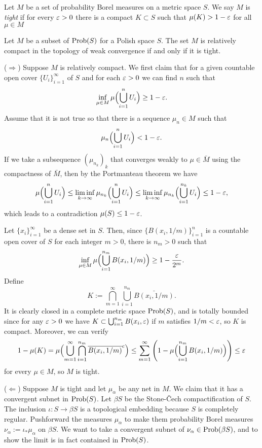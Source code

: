\documentclass[a4paper]{article}
\begin{document}
\begin{defn}
Let $M$ be a set of probability Borel measures on a metric space $S$.
We say $M$ is \emph{tight} if for every $\varepsilon>0$ there is a compact $K\subset S$ such that $\mu(K)>1-\varepsilon$ for all $\mu\in M$
\end{defn}
\begin{thm}
Let $M$ be a subset of $\operatorname{Prob}(S)$ for a Polish space $S$.
The set $M$ is relatively compact in the topology of weak convergence if and only if it is tight.
\end{thm}
\begin{pf}
($\Rightarrow$)
Suppose $M$ is relatively compact.
We first claim that for a given countable open cover $\{U_i\}_{i=1}^\infty$ of $S$ and for each $\varepsilon>0$ we can find $n$ such that
\[\inf_{\mu\in M}\mu\Bigl(\bigcup_{i=1}^nU_i\Bigr)\ge1-\varepsilon.\]
Assume that it is not true so that there is a sequence $\mu_n\in M$ such that
\[\mu_n\Bigl(\bigcup_{i=1}^nU_i\Bigr)<1-\varepsilon.\]
If we take a subsequence $(\mu_{n_k})_k$ that converges weakly to $\mu\in\bar M$ using the compactness of $\bar M$, then by the Portmanteau theorem we have
\[\mu\Bigl(\bigcup_{i=1}^nU_i\Bigr)\le\liminf_{k\to\infty}\mu_{n_k}\Bigl(\bigcup_{i=1}^nU_i\Bigr)\le\liminf_{k\to\infty}\mu_{n_k}\Bigl(\bigcup_{i=1}^{n_k}U_i\Bigr)\le1-\varepsilon,\]
which leads to a contradiction $\mu(S)\le1-\varepsilon$.

Let $\{x_i\}_{i=1}^\infty$ be a dense set in $S$.
Then, since $\{B(x_i,1/m)\}_{i=1}^n$ is a countable open cover of $S$ for each integer $m>0$, there is $n_m>0$ such that
\[\inf_{\mu\in M}\mu\Bigl(\bigcup_{i=1}^{n_m}B(x_i,1/m)\Bigr)\ge1-\frac{\varepsilon}{2^m}.\]
Define
\[K:=\bigcap_{m=1}^\infty\bigcup_{i=1}^{n_m}\bar{B(x_i,1/m)}.\]
It is clearly closed in a complete metric space $\operatorname{Prob}(S)$, and is totally bounded since for any $\varepsilon>0$ we have $K\subset\bigcup_{i=1}^{n_m}B(x_i,\varepsilon)$ if $m$ satisfies $1/m<\varepsilon$, so $K$ is compact.
Moreover, we can verify
\[1-\mu(K)=\mu\Bigl(\bigcup_{m=1}^\infty\bigcap_{i=1}^{n_m}\overline{B(x_i,1/m)}^c\Bigr)\le\sum_{m=1}^\infty\left(1-\mu\Bigl(\bigcup_{i=1}^{n_m}B(x_i,1/m)\Bigr)\right)\le\varepsilon\]
for every $\mu\in M$, so $M$ is tight.

($\Leftarrow$)
Suppose $M$ is tight and let $\mu_\alpha$ be any net in $M$.
We claim that it has a convergent subnet in $\operatorname{Prob}(S)$.
Let $\beta S$ be the Stone-\v Cech compactification of $S$.
The inclusion $\iota:S\to\beta S$ is a topological embedding because $S$ is completely regular.
Pushforward the measures $\mu_\alpha$ to make them probability Borel measures $\nu_\alpha:=\iota_*\mu_\alpha$ on $\beta S$.
We want to take a convergent subnet of $\nu_\alpha\in\operatorname{Prob}(\beta S)$, and to show the limit is in fact contained in $\operatorname{Prob}(S)$.


\end{pf}
\end{document}
